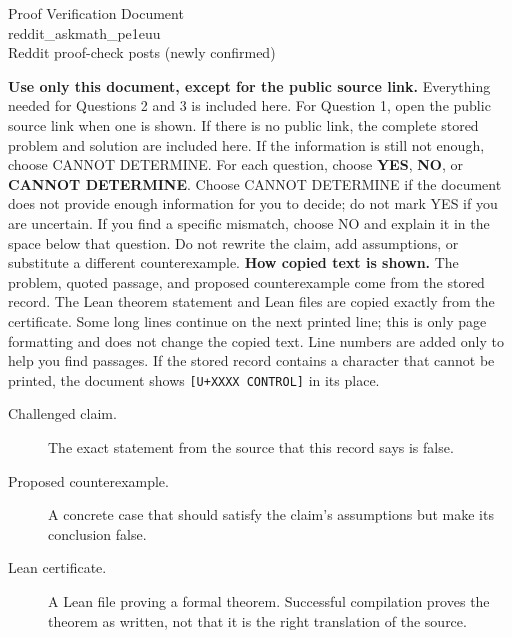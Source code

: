 \documentclass[11pt]{article}
\begin{document}
\begin{center}{\LARGE Proof Verification Document}\\[2pt]{\large reddit\_askmath\_pe1euu}\\[2pt]{\small Reddit proof-check posts (newly confirmed)}\end{center}
\begin{center}\end{center}
\textbf{Use only this document, except for the public source link.} Everything needed for Questions 2 and 3 is included here. For Question 1, open the public source link when one is shown. If there is no public link, the complete stored problem and solution are included here. If the information is still not enough, choose CANNOT DETERMINE.
For each question, choose \textbf{YES}, \textbf{NO}, or \textbf{CANNOT DETERMINE}. Choose CANNOT DETERMINE if the document does not provide enough information for you to decide; do not mark YES if you are uncertain. If you find a specific mismatch, choose NO and explain it in the space below that question. Do not rewrite the claim, add assumptions, or substitute a different counterexample.
\textbf{How copied text is shown.} The problem, quoted passage, and proposed counterexample come from the stored record. The Lean theorem statement and Lean files are copied exactly from the certificate. Some long lines continue on the next printed line; this is only page formatting and does not change the copied text. Line numbers are added only to help you find passages. If the stored record contains a character that cannot be printed, the document shows \texttt{[U+XXXX CONTROL]} in its place.
\begin{description}
\item[Challenged claim.] The exact statement from the source that this record says is false.
\item[Proposed counterexample.] A concrete case that should satisfy the claim's assumptions but make its conclusion false.
\item[Lean certificate.] A Lean file proving a formal theorem. Successful compilation proves the theorem as written, not that it is the right translation of the source.
\end{description}
\end{document}
